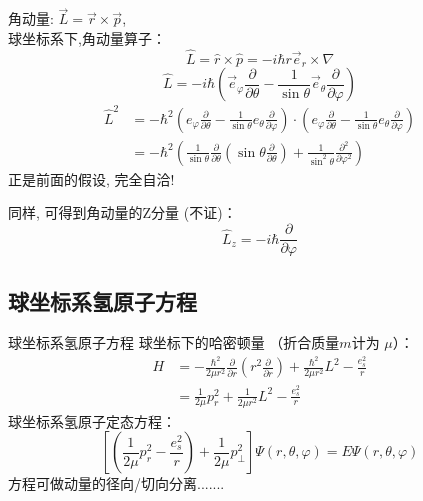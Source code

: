 	角动量: $ \vec{L}= \vec{r}\times \vec{p} $, \\
	球坐标系下,角动量算子：
	\begin{equation*}
		\hat{L}= \hat{r}\times \hat{p} = -i \hbar r \vec{e}_r \times \nabla  
	\end{equation*}
	\begin{equation*}
		\hat{L}=   -i \hbar   ( \vec{e}_{\varphi} \frac{\partial}{\partial \theta} - \frac{1}{\sin \theta}  \vec{e}_{\theta} \frac{\partial}{\partial \varphi} )
	\end{equation*}
	\begin{equation*}
		\begin{split}
		\hat{L}	^2 &=   - \hbar ^2  ( e_{\varphi} \frac{\partial}{\partial \theta} - \frac{1}{\sin \theta}  e_{\theta} \frac{\partial}{\partial \varphi} )  \cdot   ( e_{\varphi} \frac{\partial}{\partial \theta} - \frac{1}{\sin \theta}  e_{\theta} \frac{\partial}{\partial \varphi} ) \\
		&= - \hbar ^2 (\frac{1}{\sin \theta  } \frac{\partial }{\partial \theta } (\sin \theta \frac{\partial }{\partial \theta } )
		+\frac{1}{\sin^2 \theta  } \frac{\partial^2}{\partial\varphi ^2} ) 	
		\end{split}
	\end{equation*}
	正是前面的假设, 完全自洽!\\ \vspace{1em}

	同样, 可得到角动量的Z分量 (不证)：
	\begin{equation*}
		\hat{L}_z= -i \hbar \frac{\partial }{\partial\varphi }
	\end{equation*}	
	

\subsection{球坐标系氢原子方程 }	


	{ 球坐标系氢原子方程 }	
	球坐标下的哈密顿量 （折合质量$m$计为 $\mu$）：
	\begin{equation*}
		\begin{split}
		H&=-\frac{\hbar^2}{2 \mu r^2}  \frac{\partial }{\partial r} (r^2\frac{\partial }{\partial r} ) +  \frac{\hbar^2}{2 \mu r^2} L^2  -\frac{e_s ^2}{r} \\
		&= \frac{1}{2 \mu } p_r ^2 +  \frac{1}{2 \mu r^2} L^2  -\frac{e_s ^2}{r} 	
		\end{split}	
	\end{equation*}	
	球坐标系氢原子定态方程：	
	\begin{equation*}
		\left[ (\frac{1}{2 \mu } p_r ^2  -\frac{e_s ^2}{r})  +\frac{1}{2 \mu }	p_ \perp  ^2   \right] \Psi (r,\theta,\varphi) =E \Psi (r,\theta,\varphi)  
	\end{equation*}	
	方程可做动量的径向/切向分离.......\\
		


